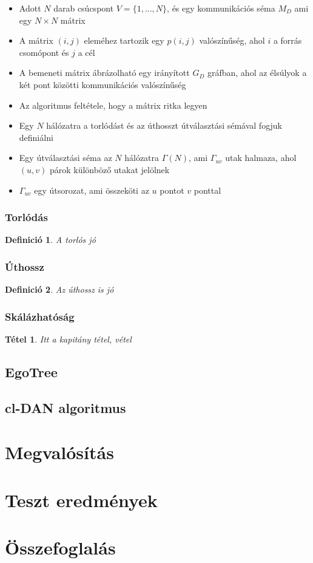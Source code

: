 \documentclass[12pt]{report}
\newtheorem{mydef}{Definició}
\newtheorem{mytetel}{Tétel}
\begin{document}
\begin{itemize}
	\item Adott $N$ darab csúcspont  $V = \{1, ..., N\}$, és egy kommunikációs séma $M_D$ ami egy $N\times N$ mátrix
	\item A mátrix $(i, j)$ eleméhez tartozik egy $p(i, j)$ valószínűség, ahol $i$ a forrás csomópont és $j$ a cél
	\item A bemeneti mátrix ábrázolható egy irányított
	$G_D$ gráfban, ahol az élsúlyok a két pont közötti kommunikációs valószínűség
	\item Az algoritmus feltétele, hogy a mátrix ritka legyen
	\item Egy $N$ hálózatra a torlódást és az úthosszt útválasztási sémával fogjuk definiálni
	\item Egy útválasztási séma az $N$ hálózatra $\Gamma(N)$, ami $\Gamma_{uv}$ utak halmaza, ahol $(u, v)$ párok különböző utakat jelölnek
	\item $\Gamma_{uv}$ egy útsorozat, ami összeköti az $u$ pontot $v$ ponttal
\end{itemize}

\subsection{Torlódás}

\begin{mydef}
	A torlós jó
\end{mydef}

\subsection{Úthossz}

\begin{mydef}
	Az úthossz is jó
\end{mydef}

\subsection{Skálázhatóság}

\begin{mytetel}
	Itt a kapitány tétel, vétel
\end{mytetel}

\section{EgoTree}

\section{cl-DAN algoritmus}

\chapter{Megvalósítás}

\chapter{Teszt eredmények}

\chapter{Összefoglalás}




	
\end{document}
